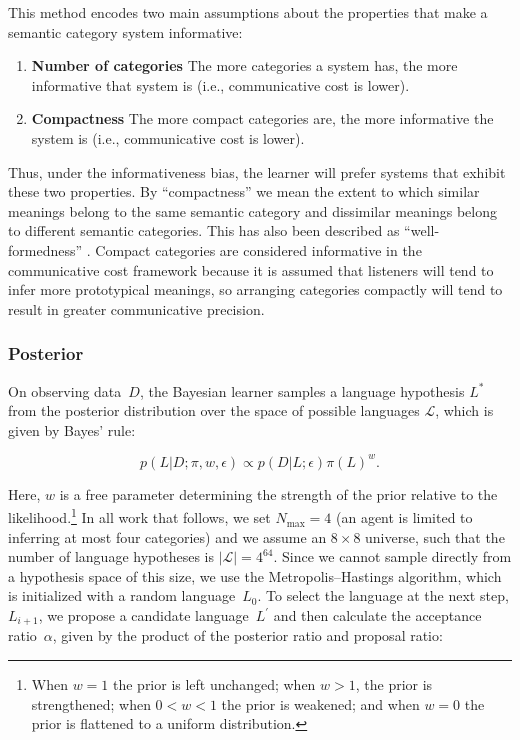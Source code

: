 \documentclass[doc,biblatex]{apa7}
\begin{document}
This method encodes two main assumptions about the properties that make a semantic category system informative:

	\begin{enumerate}
		\item \textbf{Number of categories} The more categories a system has, the more informative that system is (i.e., communicative cost is lower).
		\item \textbf{Compactness} The more compact categories are, the more informative the system is (i.e., communicative cost is lower).
	\end{enumerate}

\noindent Thus, under the informativeness bias, the learner will prefer systems that exhibit these two properties. By ``compactness'' we mean the extent to which similar meanings belong to the same semantic category and dissimilar meanings belong to different semantic categories. This has also been described as ``well-formedness'' \parencite{Regier:2007}. Compact categories are considered informative in the communicative cost framework because it is assumed that listeners will tend to infer more prototypical meanings, so arranging categories compactly will tend to result in greater communicative precision.

\subsubsection{Posterior}

On observing data~$D$, the Bayesian learner samples a language hypothesis $L^\ast$ from the posterior distribution over the space of possible languages $\mathcal{L}$, which is given by Bayes' rule:

	\begin{equation}
	p(L|D; \pi,w,\epsilon) \propto p(D|L; \epsilon) \pi(L)^w.
	\label{posterior}
	\end{equation}

\noindent Here, $w$ is a free parameter determining the strength of the prior relative to the likelihood.\footnote{When $w=1$ the prior is left unchanged; when $w>1$, the prior is strengthened; when $0 < w < 1$ the prior is weakened; and when $w=0$ the prior is flattened to a uniform distribution.} In all work that follows, we set $N_\mathrm{max} = 4$ (an agent is limited to inferring at most four categories) and we assume an $8 \times 8$ universe, such that the number of language hypotheses is $|\mathcal{L}| = 4^{64}$. Since we cannot sample directly from a hypothesis space of this size, we use the Metropolis--Hastings algorithm, which is initialized with a random language~$L_0$. To select the language at the next step, $L_{i+1}$, we propose a candidate language~$L^\prime$ and then calculate the acceptance ratio~$\alpha$, given by the product of the posterior ratio and proposal ratio:
\end{document}
